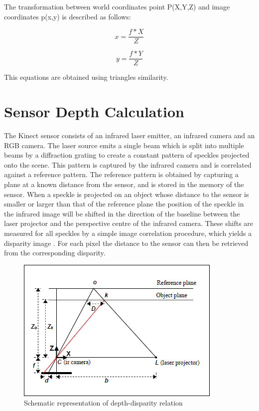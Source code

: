 The transformation between world coordinates point P(X,Y,Z) and image coordinates p(x,y) is described as 
follows:

\begin{equation}
\label{eq:disparity2}
 x = \frac{f*X}{Z}
\end{equation}

\begin{equation}
\label{eq:disparity2}
 y = \frac{f*Y}{Z}
\end{equation}

This equations are  obtained using triangles similarity.

\section{Sensor Depth Calculation}

The Kinect sensor consists of an infrared laser emitter, an 
infrared camera and an RGB camera. The laser source emits a single 
beam which is split into multiple beams by a diffraction 
grating to create a constant 
pattern of speckles projected onto the scene. This pattern is 
captured by the infrared camera and is correlated against a 
reference pattern. The reference pattern is obtained by capturing 
a plane at a known distance from the sensor, and is stored in the 
memory of the sensor. When a speckle is projected on an object 
whose distance to the sensor is smaller or larger than that of the 
reference plane the position of the speckle in the infrared image 
will be shifted in the direction of the baseline between the laser 
projector and the perspective centre of the infrared camera. 
These shifts are measured for all speckles by a simple image 
correlation procedure, which yields a disparity image \cite{khoshelham2011accuracy} . For each 
pixel the distance to the sensor can then be retrieved from the 
corresponding disparity.



\begin{figure}[h!]
\begin{center}
\includegraphics[scale=1]{images/kinect_triangulation}
\caption{Schematic representation of depth-disparity relation \cite{khoshelham2011accuracy}}
\label{fig:disparity}
\end{center}
\end{figure}


